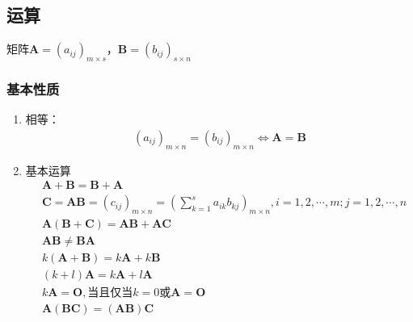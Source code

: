 \documentclass[12pt]{book}
\begin{document}
\subsection{运算}
矩阵$\mathbf{A}=(a_{ij})_{m\times s}$，$\mathbf{B}=(b_{ij})_{s\times n}$



\subsubsection{基本性质}



\begin{enumerate}[1.]
    \item 相等：
          \begin{gather*}
              (a_{ij})_{m\times n} = (b_{ij})_{m\times n} \Leftrightarrow \mathbf{A}=\mathbf{B}
          \end{gather*}
    \item 基本运算
          \begin{align*}
               & \mathbf{A}+\mathbf{B} = \mathbf{B} + \mathbf{A}                                                                                \\
               & \bm{C}=\bm{AB} = (c_{ij})_{m\times n} = \left( \sum_{k=1}^{s}{a_{ik}b_{kj}} \right)_{m\times n}, i=1,2,\cdots,m;j=1,2,\cdots,n \\
               & \mathbf{A}(\mathbf{B}+\mathbf{C}) = \mathbf{A}\mathbf{B}+\mathbf{A}\mathbf{C}                                                  \\
               & \mathbf{A}\mathbf{B} \neq \mathbf{B}\mathbf{A}                                                                                 \\
               & k(\bm{A}+\bm{B})=k\bm{A}+k\bm{B}                                                                                               \\
               & (k+l)\bm{A} = k\bm{A}+l\bm{A}                                                                                                  \\
               & k\bm{A}=\bm{O}, \text{当且仅当}k=0\text{或}\bm{A}=\bm{O}                                                                       \\
               & \bm{A}(\bm{BC}) = (\bm{AB})\bm{C}                                                                                              \\

\end{align*}
\end{enumerate}
\end{document}
